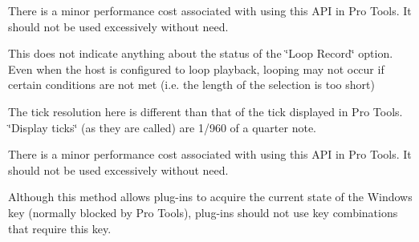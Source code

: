 \begin{DoxyRefList}
\begin{DoxyItemize}
\end{DoxyItemize}
\item[Member \mbox{\hyperlink{a02173_a51aebee28b9d285863c3527e936dd733}{AAX\+\_\+\+ITransport\+::Get\+Bar\+Beat\+Position}} (int32\+\_\+t $\ast$\+Bars, int32\+\_\+t $\ast$\+Beats, int64\+\_\+t $\ast$\+Display\+Ticks, int64\+\_\+t Sample\+Location) const =0]\label{a00801__compatibility_notes000065}%
%
 There is a minor performance cost associated with using this API in Pro Tools. It should not be used excessively without need. 
\item[Member \mbox{\hyperlink{a02173_a386bade7d8902130a02c6e6dc8b2123b}{AAX\+\_\+\+ITransport\+::Get\+Current\+Loop\+Position}} (bool $\ast$b\+Looping, int64\+\_\+t $\ast$\+Loop\+Start\+Tick, int64\+\_\+t $\ast$\+Loop\+End\+Tick) const =0]\label{a00801__compatibility_notes000063}%
%
 This does not indicate anything about the status of the \char`\"{}\+Loop Record\char`\"{} option. Even when the host is configured to loop playback, looping may not occur if certain conditions are not met (i.\+e. the length of the selection is too short) 
\item[Member \mbox{\hyperlink{a02173_a2d99dca311ddca98c4d455078edd42d5}{AAX\+\_\+\+ITransport\+::Get\+Current\+Tick\+Position}} (int64\+\_\+t $\ast$\+Tick\+Position) const =0]\label{a00801__compatibility_notes000062}%
%
 The tick resolution here is different than that of the tick displayed in Pro Tools. \char`\"{}\+Display ticks\char`\"{} (as they are called) are 1/960 of a quarter note. 
\item[Member \mbox{\hyperlink{a02173_a85aae48051f8596e8145268ecf173dcb}{AAX\+\_\+\+ITransport\+::Get\+Custom\+Tick\+Position}} (int64\+\_\+t $\ast$o\+Tick\+Position, int64\+\_\+t i\+Sample\+Location) const =0]\label{a00801__compatibility_notes000064}%
%
 There is a minor performance cost associated with using this API in Pro Tools. It should not be used excessively without need. 
\item[Member \mbox{\hyperlink{a02177_ac2fe16f6d81a8d941e36242d9f9d0980}{AAX\+\_\+\+IView\+Container\+::Get\+Modifiers}} (uint32\+\_\+t $\ast$out\+Modifiers)=0]\label{a00801__compatibility_notes000066}%
%
 Although this method allows plug-\/ins to acquire the current state of the Windows key (normally blocked by Pro Tools), plug-\/ins should not use key combinations that require this key. 

\end{DoxyRefList}
